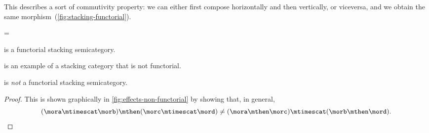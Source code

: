 %
This describes a sort of commutivity property: we can either first compose horizontally and then vertically, or viceversa, and we obtain the same morphism~(\cref{fig:stacking-functorial}).

\begin{figure*}[h]
    \centering
    =
    \caption{Commutation of stacking and composition in a functorial stacking semicategory. }
    \label{fig:stacking-functorial}
\end{figure*}


\begin{lemma}
    \SetL is a functorial stacking semicategory.
\end{lemma}


\Effects is an example of a stacking category that is not functorial.

\begin{lemma}
    \Effects is \emph{not} a functorial stacking semicategory.
\end{lemma}

\begin{proof}
    This is shown graphically in \cref{fig:effects-non-functorial} by showing that, in general,
    \begin{equation}
        (\mora \mtimescat \morb )
        \mthen (\morc \mtimescat \mord )
        \neq
        (\mora \mthen \morc ) \mtimescat (\morb \mthen \mord ).
    \end{equation}
\end{proof}

\begin{figure*}[b]
    \centering
    \caption{Proof that \Effects is not a functorial stacking category by showing that
        the two morphisms above have different representations in \SetL.}
    \label{fig:effects-non-functorial}
\end{figure*}

